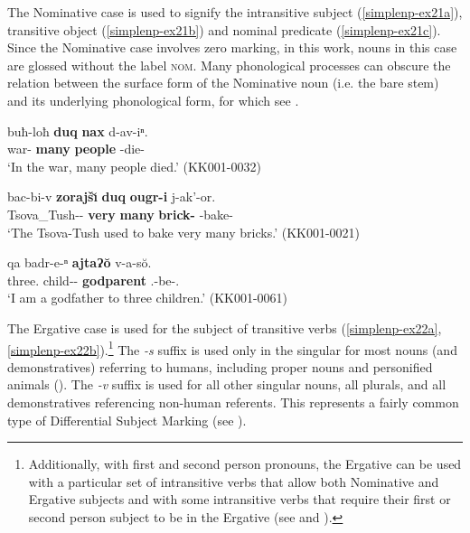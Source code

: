 The Nominative case is used to signify the intransitive subject (\ref{simplenp-ex21a}), transitive object (\ref{simplenp-ex21b}) and nominal predicate (\ref{simplenp-ex21c}). Since the Nominative case involves zero marking, in this work, nouns in this case are glossed without the label \textsc{nom}. Many phonological processes can obscure the relation between the surface form of the Nominative noun (i.e. the bare stem) and its underlying phonological form, for which see .\pagebreak

\begin{exe}
	\ex\label{simplenp-ex21}
	\begin{xlist}
		

			\ex\label{simplenp-ex21a}
			\gll buħ-loħ \textbf{duq} \textbf{nax} d-av-iⁿ. \\
			war-{\Interess} \textbf{many} \textbf{people} {\D}-die-{\Aor} \\
			\trans `In the war, many people died.'
			\hfill (KK001-0032)

		

			\ex\label{simplenp-ex21b}
			\gll bac-bi-v \textbf{zorajš\u{\i}} \textbf{duq} \textbf{ougr-i} j-ak'-or. \\
			Tsova\_Tush-{\Pl}-{\Erg} \textbf{very} \textbf{many} \textbf{brick-{\Pl}} {\J}-bake-{{\Imprf}} \\
			\trans `The Tsova-Tush used to bake very many bricks.'
			\hfill (KK001-0021)

		

			\ex\label{simplenp-ex21c}
			\gll qa badr-e-ⁿ \textbf{ajtaɁ\u{o}} v-a-s\u{o}. \\
			three.{\Obl} child-{\Obl}-{\Gen} \textbf{godparent} {\M}.{\Sg}-be-{\Fsg}.{\Nom} \\
			\trans `I am a godfather to three children.' 
			\hfill (KK001-0061)

		
		
	\end{xlist}
\end{exe}



The Ergative case is used for the subject of transitive verbs (\ref{simplenp-ex22a}, \ref{simplenp-ex22b}).\footnote{
	Additionally, with first and second person pronouns, the Ergative can be used with a particular set of intransitive verbs that allow both Nominative and Ergative subjects and with some intransitive verbs that require their first or second person subject to be in the Ergative (see  and \cite{holisky87}).} The \textit{-s} suffix is used only in the singular for most nouns (and demonstratives) referring to humans, including proper nouns and personified animals (\cite{haukharris}). The \textit{-v} suffix is used for all other singular nouns, all plurals, and all demonstratives referencing non-human referents. This represents a fairly common type of Differential Subject Marking (see \cite{aikhenwalddixon2001dsm,hoopswart2008dsm}).

